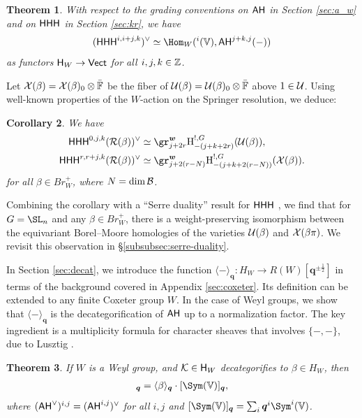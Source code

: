 \documentclass[a4paper,10pt,leqno]{amsart}
\theoremstyle{plain}
\newtheorem{mainthm}{Theorem}
\newtheorem{maincor}[mainthm]{Corollary}
\theoremstyle{plain}
\theoremstyle{plain}
\theoremstyle{definition}
\theoremstyle{remark}
\let\Alt\relax
\DeclareMathOperator{\Alt}{\text{$\Lambda$}}
\newcommand{\Br}{\mathit{Br}}
\newcommand{\Q}{\bm{q}}
\newcommand{\Tr}[1]{\langle{#1}\rangle_{\Q}}
\begin{document}
\begin{mainthm}\label{thm:a_w-to-kr}
With respect to the grading conventions on $\sf{AH}$ in Section \ref{sec:a_w} and on $\sf{HHH}$ in Section \ref{sec:kr}, we have
\begin{align}
(\sf{HHH}^{i, i + j, k})^\vee
	\simeq \Hom_W(\Alt^i(\bb{V}), \sf{AH}^{j + k, j}(-))
\end{align}
as functors $\sf{H}_W \to \sf{Vect}$ for all $i, j, k \in \bb{Z}$.
\end{mainthm}

Let $\cal{X}(\beta) = \cal{X}(\beta)_0 \otimes \bar{\bb{F}}$ be the fiber of $\cal{U}(\beta) = \cal{U}(\beta)_0 \otimes \bar{\bb{F}}$ above $1 \in \cal{U}$.
Using well-known properties of the $W$-action on the Springer resolution, we deduce:

\begin{maincor}\label{cor:kr-to-varieties}
We have
\begin{align}
\sf{HHH}^{0, j, k}(\cal{R}(\beta))^\vee
	&\simeq \gr_{j + 2r}^{\bm{w}} \ur{H}_{-(j + k + 2r)}^{!, G}(\cal{U}(\beta)),\\
\sf{HHH}^{r, r + j, k}(\cal{R}(\beta))^\vee
	&\simeq \gr_{j + 2(r - N)}^{\bm{w}} \ur{H}_{-(j + k + 2(r - N))}^{!, G}(\cal{X}(\beta)).
\end{align}
for all $\beta \in \Br_W^+$, where $N = \dim \cal{B}$.
\end{maincor}

Combining the corollary with a ``Serre duality'' result for $\sf{HHH}$ \cite{ghmn}, we find that for $G = \SL_n$ and any $\beta \in \Br_W^+$, there is a weight-preserving isomorphism between the equivariant Borel--Moore homologies of the varieties $\cal{U}(\beta)$ and $\cal{X}(\beta\pi)$.
We revisit this observation in \S\ref{subsubsec:serre-duality}.

In Section \ref{sec:decat}, we introduce the function $\Tr{-} : H_W \to R(W)[\Q^{\pm\frac{1}{2}}]$ in terms of the background covered in Appendix \ref{sec:coxeter}.
Its definition can be extended to any finite Coxeter group $W$.
In the case of Weyl groups, we show that $\Tr{-}$ is the decategorification of $\sf{AH}$ up to a normalization factor.
The key ingredient is a multiplicity formula for character sheaves that involves $\{-, -\}$, due to Lusztig \cite[Cor.\ 14.11]{lusztig_1985_3} \cite[Thm.\ 23.1]{lusztig_1986}.

\begin{mainthm}\label{thm:decat}
If $W$ is a Weyl group, and $\cal{K} \in \sf{H}_W$ decategorifies to $\beta \in H_W$, then
\begin{align}
[\sf{AH}^\vee(\cal{K})]_{\Q} = \Tr{\beta} \cdot [\Sym(\bb{V})]_{\Q},
\end{align}
where $(\sf{AH}^\vee)^{i, j} = (\sf{AH}^{i, j})^\vee$ for all $i, j$ and $[\Sym(\bb{V})]_{\Q} = \sum_i {\Q^i} \Sym^i(\bb{V})$.
\end{mainthm}
\end{document}
